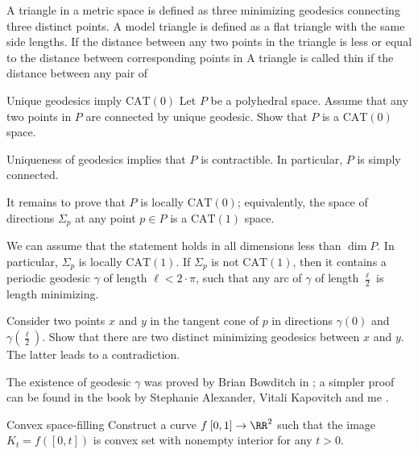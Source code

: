 A triangle in a metric space is defined as three minimizing  geodesics connecting three distinct points.
A model triangle is defined as a flat triangle with the same side lengths.
If the distance between any two points in the triangle is less or equal to the distance between corresponding points in 
A triangle is called thin if the distance between any pair of


\begin{pr}{\easy}{Unique geodesics imply $\mathrm{CAT}(0)$}\label{Unique geodesics imply CAT}
Let $P$ be a polyhedral space.
Assume that any two points in $P$ 
are connected by unique geodesic.
Show that $P$ is a $\mathrm{CAT}(0)$ space.
\end{pr}


Uniqueness of geodesics implies that $P$ is contractible.
In particular, $P$ is simply connected.

It remains to prove that $P$ is locally $\mathrm{CAT}(0)$;
equivalently, the space of directions $\Sigma_p$
at any point $p\in P$ is  a $\mathrm{CAT}(1)$ space.

We can assume that the statement holds in all dimensions less than $\dim P$. 
In particular, $\Sigma_p$ is locally $\mathrm{CAT}(1)$.
If $\Sigma_p$ is not $\mathrm{CAT}(1)$,
then it contains a periodic geodesic $\gamma$ of length $\ell<2\cdot\pi$,
such that any arc of $\gamma$ of length $\tfrac\ell2$ is length minimizing.

Consider two points $x$ and $y$
in the tangent cone of $p$
in directions $\gamma(0)$ and $\gamma(\tfrac\ell2)$.
Show that there are two distinct minimizing geodesics between $x$ and $y$.
The latter leads to a contradiction.
\qeds

The existence of geodesic $\gamma$ was proved by Brian Bowditch in \cite{bowditch};
a simpler proof can be found in the book 
by Stephanie Alexander, Vitali Kapovitch and me \cite[see][]{akp}.















\begin{pr}{\thm}{Convex space-filling}\label{Convex space-filling}
Construct a curve $f\:[0,1]\to \RR^2$
such that 
the image $K_t=f([0,t])$ is convex set with nonempty interior
for any $t>0$. 
\end{pr}

